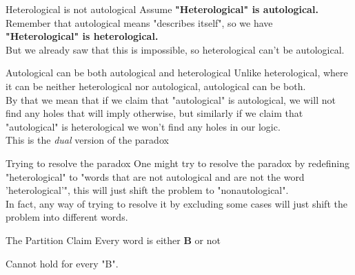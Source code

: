 \begin{frame}{Heterological is not autological}
	Assume \textbf{"Heterological" is autological.}\pause\\
	Remember that autological means "describes itself", so we have\pause\\
	\textbf{"Heterological" is heterological.}\pause\\
	But we already saw that this is impossible, so heterological can't be autological.
\end{frame}

\begin{frame}{Autological can be both autological and heterological}
	Unlike heterological, where it can be neither heterological nor autological, autological can be both.\pause\\
	By that we mean that if we claim that "autological" is autological, we will not find any holes that will imply otherwise\pause, but similarly if we claim that "autological" is heterological we won't find any holes in our logic.\pause\\
	This is the \textit{dual} version of the paradox
\end{frame}

\begin{frame}{Trying to resolve the paradox}
	One might try to resolve the paradox by redefining "heterological" to "words that are not autological and are not the word 'heterological'"\pause, this will just shift the problem to "nonautological".\pause\\
	In fact, any way of trying to resolve it by excluding some cases will just shift the problem into different words.\pause\\
	\begin{block}{The Partition Claim}
		Every word is either \textbf{B} or not
	\end{block}
	Cannot hold for every "B".
\end{frame}


